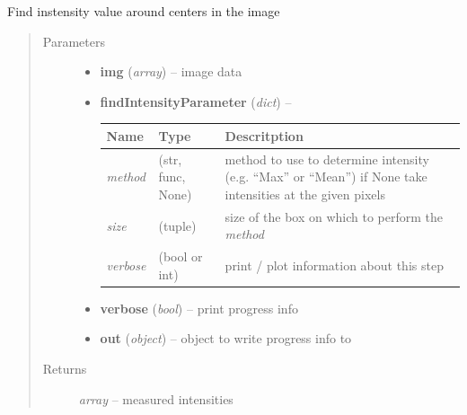 \documentclass[letterpaper,10pt,english]{sphinxmanual}
\begin{document}
\begin{fulllineitems}
\label{api/ClearMap.ImageProcessing:ClearMap.ImageProcessing.MaximaDetection.findIntensity}
Find instensity value around centers in the image
\begin{quote}\begin{description}
\item[{Parameters}] \leavevmode\begin{itemize}
\item {} 
\textbf{img} (\emph{array}) --
image data

\item {} 
\textbf{findIntensityParameter} (\emph{dict}) --

\begin{tabulary}{\linewidth}{|L|L|L|}
\hline
\textsf{\relax 
Name
} & \textsf{\relax 
Type
} & \textsf{\relax 
Descritption
}\\
\hline
\emph{method}
 & 
(str, func, None)
 & 
method to use to determine intensity (e.g. ``Max'' or ``Mean'')
if None take intensities at the given pixels
\\
\hline
\emph{size}
 & 
(tuple)
 & 
size of the box on which to perform the \emph{method}
\\
\hline
\emph{verbose}
 & 
(bool or int)
 & 
print / plot information about this step
\\
\hline\end{tabulary}


\item {} 
\textbf{verbose} (\emph{bool}) --
print progress info

\item {} 
\textbf{out} (\emph{object}) --
object to write progress info to

\end{itemize}

\item[{Returns}] \leavevmode
\emph{array} --
measured intensities

\end{description}\end{quote}

\end{fulllineitems}
\end{document}
